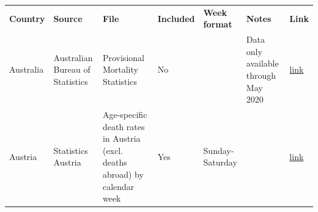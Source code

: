 \documentclass[
]{article}
\begin{document}
\begin{landscape}
\begin{table}[]
\footnotesize
\begin{tabular}{p{.5in}p{1.5in}p{2in}p{1in}p{1.5in}p{1in}p{.5in}}
\textbf{Country} & \textbf{Source}                                                                                                                                                      & \textbf{File}                                                                                                                                                              & \textbf{Included} & \textbf{Week format}                                       & \textbf{Notes}                                                           & \textbf{Link}                                                                                                                                                                                                                                                                                                                                                 \\
Australia        & Australian Bureau of Statistics                                                                                                                                      & Provisional Mortality Statistics                                                                                                                                           & No                &                                                          & Data only available through May 2020                                     & \href{https://www.abs.gov.au/statistics/health/causes-death/provisional-mortality-statistics/latest-release}{link}                                                                                                                                                                                                                         \\
Austria          & Statistics Austria                                                                                                                                                   & Age-specific death rates in Austria (excl. deaths abroad) by   calendar week                                                                                               & Yes               & Sunday-Saturday                                          &                                                                          & \href{https://statcube.at/statcube/opendatabase?id=derate\_kalwo}{link}  \\

\end{tabular}
\end{table}
\end{landscape}
\end{document}
